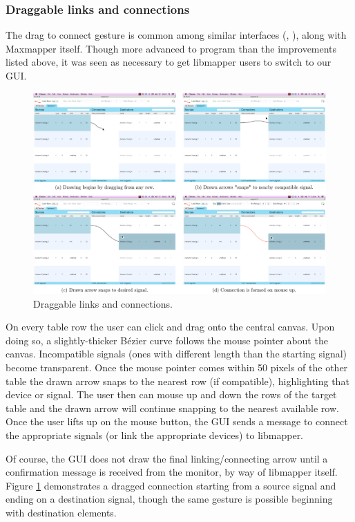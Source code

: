 		\subsubsection{Draggable links and connections}

The drag to connect gesture is common among similar interfaces (, ), along with Maxmapper itself. Though more advanced to program than the improvements listed above, it was seen as necessary to get libmapper users to switch to our GUI.

\begin{figure}[h]
	\centering
	\includegraphics[width=1\textwidth]{figures/drawing}
	\caption{Draggable links and connections.}
	\label{fig:drawing}
\end{figure}

On every table row the user can click and drag onto the central canvas. Upon doing so, a slightly-thicker B\'ezier curve follows the mouse pointer about the canvas. Incompatible signals (ones with different length than the starting signal) become transparent. Once the mouse pointer comes within 50 pixels of the other table the drawn arrow snaps to the nearest row (if compatible), highlighting that device or signal. The user then can mouse up and down the rows of the target table and the drawn arrow will continue snapping to the nearest available row. Once the user lifts up on the mouse button, the GUI sends a message to connect the appropriate signals (or link the appropriate devices) to libmapper.

Of course, the GUI does not draw the final linking/connecting arrow until a confirmation message is received from the monitor, by way of libmapper itself. Figure \ref{fig:drawing} demonstrates a dragged connection starting from a source signal and ending on a destination signal, though the same gesture is possible beginning with destination elements.

